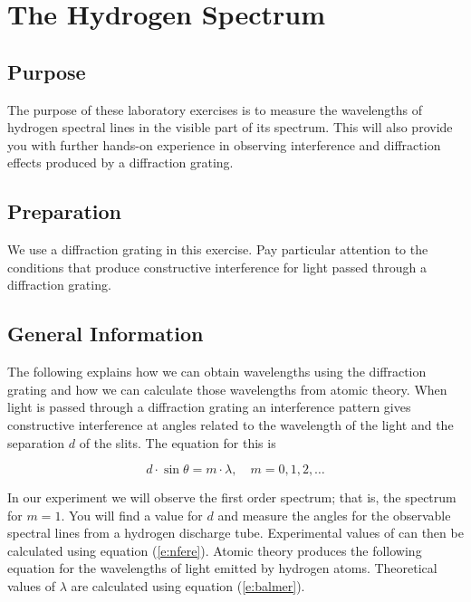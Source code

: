 \chapter{The Hydrogen Spectrum}

\section{Purpose}
  The purpose of these laboratory exercises is to measure the wavelengths of hydrogen spectral lines in the visible part of its spectrum.  This will also provide you with further hands-on experience in observing interference and diffraction effects produced by a diffraction grating.

\section{Preparation}
  We use a diffraction grating in this exercise. Pay particular attention to the conditions that produce constructive interference for light passed through a diffraction grating.
  
\section{General Information}
The following explains how we can obtain wavelengths using the diffraction grating and how we can calculate those wavelengths from atomic theory.
When light is passed through a diffraction grating an interference pattern gives constructive interference at angles  related to the wavelength  of the light and the separation $d$ of the slits.  The equation for this is

\begin{equation} \label{e:nfere} 
	d\cdot \sin\theta = m\cdot \lambda, \quad m = 0, 1, 2, \dots
\end {equation}

In our experiment we will observe the first order spectrum; that is, the spectrum for $m = 1$.  You will find a value for $d$ and measure the angles  for the observable spectral lines from a hydrogen discharge tube.  Experimental values of  can then be calculated using equation (\ref{e:nfere}).
Atomic theory produces the following equation for the wavelengths of light emitted by hydrogen atoms.  Theoretical values of $\lambda$ are calculated using equation (\ref{e:balmer}).

